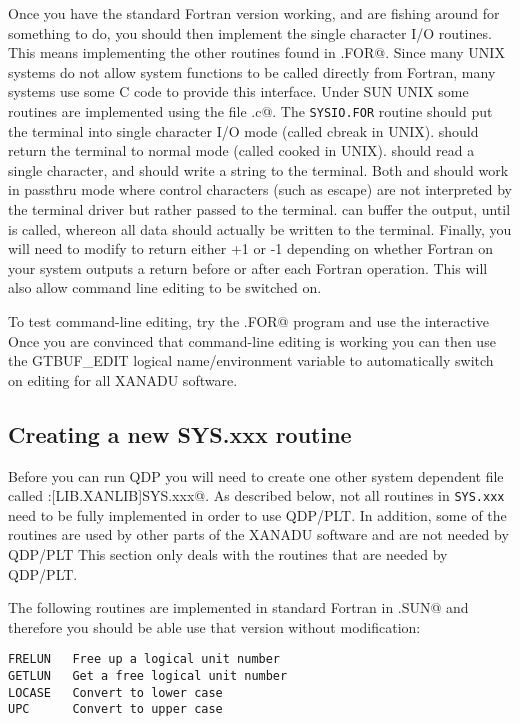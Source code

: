 Once you have the standard Fortran version working,
and are fishing around for something to do,
you should then implement the single character I/O routines.
This means implementing the other routines found in \verb@SYSIO.FOR@.
Since many UNIX systems do not allow system functions to be called
directly from Fortran, many systems use some C code to provide this
interface.
Under SUN UNIX some routines are implemented using the file \verb@ciosun.c@.
The {\tt SYSIO.FOR} routine \verb@TTINIT@ should put the terminal
into single character I/O mode (called cbreak in UNIX).
\verb@TTRSET@ should return the
terminal to normal mode (called cooked in UNIX).
\verb@RDCHR@ should read a single character, and \verb@PUTSTR@ should
write a string to the terminal.
Both \verb@RDCHR@ and \verb@PUTSTR@ should work in passthru mode where
control characters (such as escape) are not interpreted by the terminal
driver but rather passed to the terminal.
\verb@PUTSTR@ can buffer the output, until \verb@FLUSH@ is called,
whereon all data should actually be written to the terminal.
Finally, you will need to modify \verb@FORTYP@ to return either +1
or -1 depending on whether Fortran on your system outputs a return
before or after each Fortran \verb@WRITE@ operation.
This will also allow command line editing to be switched on.

To test command-line editing, try the \verb@TSTREC.FOR@ program and
use the interactive \verb@%ED%ON@ command to switch it on.
Once you are convinced that command-line editing is working you can
then use the GTBUF\_EDIT logical name/environment variable to
automatically switch on editing for all XANADU software.

\subsection{Creating a new SYS.xxx routine}

Before you can run QDP you will need to create one other system
dependent file called \verb@XANADU:[LIB.XANLIB]SYS.xxx@.
As described below, not all routines in {\tt SYS.xxx} need to be fully
implemented in order to use QDP/PLT.
In addition, some of the routines are used by other parts of the
XANADU software and are not needed by QDP/PLT
This section only deals with the routines that are needed by QDP/PLT.

The following routines are implemented in standard Fortran in
\verb@SYS.SUN@ and therefore you should be able use that version
without modification:
\begin{verbatim}
FRELUN   Free up a logical unit number
GETLUN   Get a free logical unit number
LOCASE   Convert to lower case
UPC      Convert to upper case
\end{verbatim}

